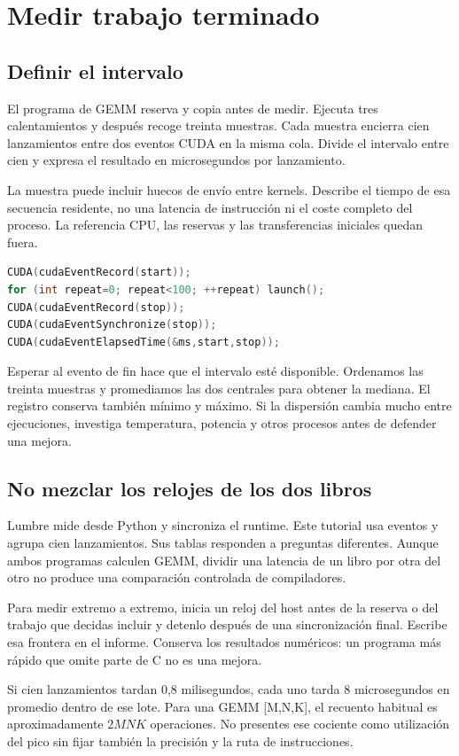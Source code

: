 \documentclass[12pt,a4paper,oneside]{report}
\begin{document}
\chapter{Medir trabajo terminado}
\section{Definir el intervalo}
El programa de GEMM reserva y copia antes de medir. Ejecuta tres calentamientos y después recoge treinta muestras. Cada muestra encierra cien lanzamientos entre dos eventos CUDA en la misma cola. Divide el intervalo entre cien y expresa el resultado en microsegundos por lanzamiento.

La muestra puede incluir huecos de envío entre kernels. Describe el tiempo de esa secuencia residente, no una latencia de instrucción ni el coste completo del proceso. La referencia CPU, las reservas y las transferencias iniciales quedan fuera.

\begin{lstlisting}[language=C++]
CUDA(cudaEventRecord(start));
for (int repeat=0; repeat<100; ++repeat) launch();
CUDA(cudaEventRecord(stop));
CUDA(cudaEventSynchronize(stop));
CUDA(cudaEventElapsedTime(&ms,start,stop));
\end{lstlisting}
Esperar al evento de fin hace que el intervalo esté disponible. Ordenamos las treinta muestras y promediamos las dos centrales para obtener la mediana. El registro conserva también mínimo y máximo. Si la dispersión cambia mucho entre ejecuciones, investiga temperatura, potencia y otros procesos antes de defender una mejora.

\section{No mezclar los relojes de los dos libros}
Lumbre mide desde Python y sincroniza el runtime. Este tutorial usa eventos y agrupa cien lanzamientos. Sus tablas responden a preguntas diferentes. Aunque ambos programas calculen GEMM, dividir una latencia de un libro por otra del otro no produce una comparación controlada de compiladores.

Para medir extremo a extremo, inicia un reloj del host antes de la reserva o del trabajo que decidas incluir y detenlo después de una sincronización final. Escribe esa frontera en el informe. Conserva los resultados numéricos: un programa más rápido que omite parte de C no es una mejora.

\begin{comprueba}
Si cien lanzamientos tardan 0,8 milisegundos, cada uno tarda 8 microsegundos en promedio dentro de ese lote. Para una GEMM [M,N,K], el recuento habitual es aproximadamente $2MNK$ operaciones. No presentes ese cociente como utilización del pico sin fijar también la precisión y la ruta de instrucciones.

\end{comprueba}
\end{document}
